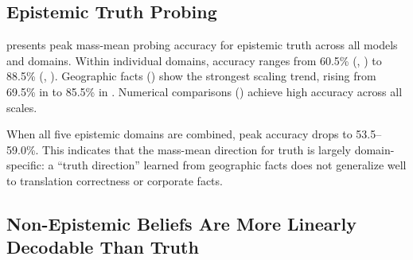 \subsection{Epistemic Truth Probing}
\label{sec:truth_results}

 presents peak mass-mean probing accuracy for epistemic truth across all models and domains. Within individual domains, accuracy ranges from 60.5\% (\companies, \gptmedium) to 88.5\% (\largerthan, \gptmedium). Geographic facts (\cities) show the strongest scaling trend, rising from 69.5\% in \gptsmall to 85.5\% in \gptxl. Numerical comparisons (\largerthan) achieve high accuracy across all scales.

When all five epistemic domains are combined, peak accuracy drops to 53.5--59.0\%. This indicates that the mass-mean direction for truth is largely domain-specific: a ``truth direction'' learned from geographic facts does not generalize well to translation correctness or corporate facts.

\begin{table}[t]
\centering
\caption{Peak epistemic truth probing accuracy (\%) by dataset and model. Peak layer shown in parentheses. Best result per domain in \textbf{bold}.}
\label{tab:epistemic_results}
\end{table}

\subsection{Non-Epistemic Beliefs Are More Linearly Decodable Than Truth}
\label{sec:comparison}

